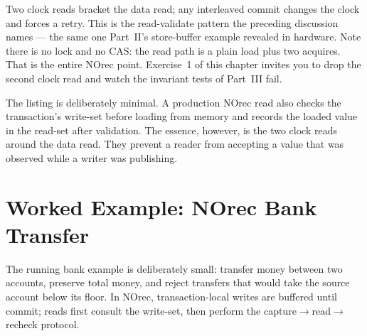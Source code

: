 Two clock reads bracket the data read; any interleaved commit changes the clock and forces a retry. This is the read-validate pattern the preceding discussion names --- the same one Part~II's store-buffer example revealed in hardware. Note there is no lock and no CAS: the read path is a plain load plus two acquires. That is the entire NOrec point. Exercise~1 of this chapter invites you to drop the second clock read and watch the invariant tests of Part~III fail.

The listing is deliberately minimal. A production NOrec read also checks the transaction's write-set before loading from memory and records the loaded value in the read-set after validation. The essence, however, is the two clock reads around the data read. They prevent a reader from accepting a value that was observed while a writer was publishing.

\section{Worked Example: NOrec Bank Transfer}
\label{sec:norec-bank-transfer-example}

The running bank example is deliberately small: transfer money between two
accounts, preserve total money, and reject transfers that would take the
source account below its floor.  In NOrec, transaction-local writes are buffered
until commit; reads first consult the write-set, then perform the
capture$\rightarrow$read$\rightarrow$recheck protocol.

